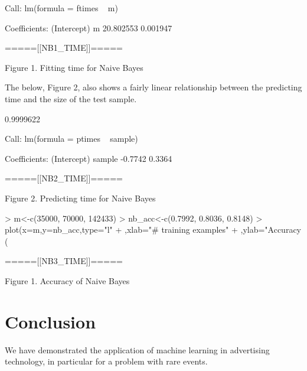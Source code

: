 \documentclass[a4paper]{article}
\begin{document}
\begin{multicols}{2}
\begin{Schunk}
\begin{Soutput}
Call:
lm(formula = ftimes ~ m)

Coefficients:
(Intercept)            m  
  20.802553     0.001947  


\end{Soutput}
\end{Schunk}
\begin{center}
=====[[NB1\_TIME]]=====

Figure 1. Fitting time for Naive Bayes
\end{center}
The below, Figure 2, also shows a fairly linear relationship between the predicting time and the size of the test sample.
\begin{Schunk}
\begin{Soutput}
[1] 0.9999622

\end{Soutput}
\begin{Soutput}

Call:
lm(formula = ptimes ~ sample)

Coefficients:
(Intercept)       sample  
    -0.7742       0.3364  


\end{Soutput}
\end{Schunk}
\begin{center}
=====[[NB2\_TIME]]=====

Figure 2. Predicting time for Naive Bayes
\end{center}

\begin{Schunk}
\begin{Sinput}
> m<-c(35000, 70000, 142433)
> nb_acc<-c(0.7992, 0.8036, 0.8148)
> plot(x=m,y=nb_acc,type="l"
+      ,xlab="# training examples"
+      ,ylab="Accuracy (%)")
\end{Sinput}
\end{Schunk}
\begin{center}
=====[[NB3\_TIME]]=====

Figure 1. Accuracy of Naive Bayes
\end{center}


\section*{Conclusion}
We have demonstrated the application of machine learning in advertising technology, in particular for a problem with rare events. 



\end{multicols}
\end{document}
